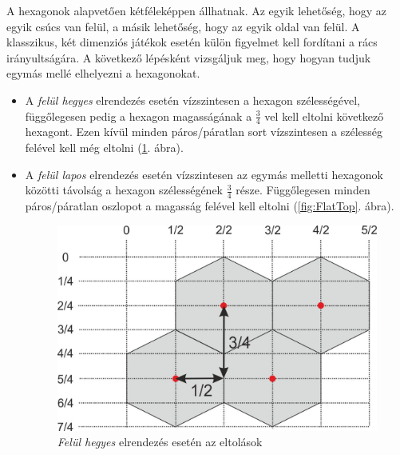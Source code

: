 A hexagonok alapvetően kétféleképpen állhatnak. Az egyik lehetőség, hogy az egyik csúcs van felül, a másik lehetőség, hogy az egyik oldal van felül. A klasszikus, két dimenziós játékok esetén külön figyelmet kell fordítani a rács irányultságára. A következő lépésként vizsgáljuk meg, hogy hogyan tudjuk egymás mellé elhelyezni a hexagonokat.
\begin{itemize}
    \item A \textit{felül hegyes} elrendezés esetén vízszintesen a hexagon szélességével, függőlegesen pedig a hexagon magasságának a $\frac{3}{4}$ vel kell eltolni következő hexagont. Ezen kívül minden páros/páratlan sort vízszintesen a szélesség felével kell még eltolni (\ref{fig:PointyTop}. ábra).
    \item A \textit{felül lapos} elrendezés esetén vízszintesen az egymás melletti hexagonok közötti távolság a hexagon szélességének $\frac{3}{4}$ része. Függőlegesen minden páros/páratlan oszlopot a magasság felével kell eltolni (\ref{fig:FlatTop}. ábra).

\begin{figure}[h!]
\centering
\includegraphics[scale=1.0]{kepek/PointyTop.jpg}
\caption{\textit{Felül hegyes} elrendezés esetén az eltolások}
\label{fig:PointyTop}
\end{figure}


\end{itemize}
